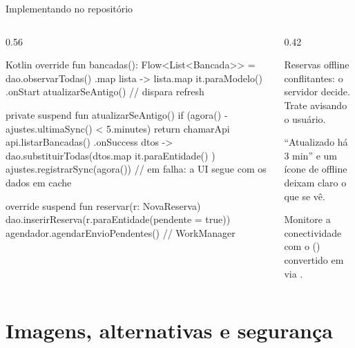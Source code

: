 \documentclass[aspectratio=169,10pt]{beamer}
\begin{document}
\begin{frame}[fragile]{Implementando no repositório}
  \begin{columns}[T]
    \begin{column}{0.56\textwidth}
\begin{codigo}[title=BancadaRepositoryImpl.kt]{Kotlin}
override fun bancadas(): Flow<List<Bancada>> =
  dao.observarTodas()
    .map { lista -> lista.map { it.paraModelo() } }
    .onStart { atualizarSeAntigo() }   // dispara refresh

private suspend fun atualizarSeAntigo() {
  if (agora() - ajustes.ultimaSync() < 5.minutes) return
  chamarApi { api.listarBancadas() }.onSuccess { dtos ->
    dao.substituirTodas(dtos.map { it.paraEntidade() })
    ajustes.registrarSync(agora())
  } // em falha: a UI segue com os dados em cache
}

override suspend fun reservar(r: NovaReserva) {
  dao.inserirReserva(r.paraEntidade(pendente = true))
  agendador.agendarEnvioPendentes()   // WorkManager
}
\end{codigo}
    \end{column}
    \begin{column}{0.42\textwidth}
      \begin{atencao}[Conflitos]
        Reservas offline conflitantes: o servidor decide. Trate  avisando o usuário.
      \end{atencao}
      \begin{dica}
        ``Atualizado há 3 min'' e um ícone de offline deixam claro o que se vê.
      \end{dica}
      \begin{dica}
        Monitore a conectividade com o  (\-) convertido em  via .
      \end{dica}
    \end{column}
  \end{columns}
\end{frame}

\section{Imagens, alternativas e segurança}
\end{document}
